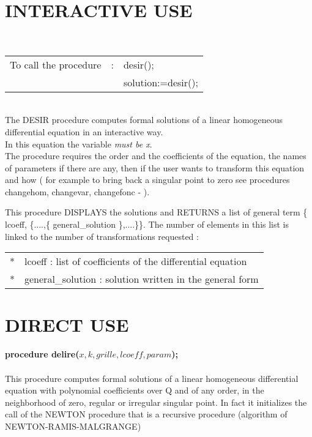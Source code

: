 \documentclass[a4paper]{article}
\begin{document}
\section{INTERACTIVE USE}
\ \\
\begin{tabular}{lcl}
To call the procedure & : & desir(); \\
                      &   & solution:=desir(); \\
\end{tabular}
\ \\
The DESIR procedure computes formal solutions of a linear homogeneous
differential equation in an interactive way. \\
In this equation the variable \emph{must be x}. \\

The procedure requires the order and the coefficients of the equation, the
names of parameters if there are any, then if the user wants to transform
this equation and how ( for example to bring back a singular point to zero
see procedures changehom, changevar, changefonc - ). \par
This procedure DISPLAYS the solutions and RETURNS a list of general term
\{ lcoeff, \{....,\{ general\_solution \},....\}\}. The number of elements in
this list is linked to the number of transformations requested : \\
\begin{tabular}{rl}
{*} & lcoeff : list of coefficients of the differential equation \\
{*} & general\_solution : solution written in the general form \\
\end{tabular}

\section{DIRECT USE}

{\bf procedure delire($x,k,grille,lcoeff,param$);} \\
\ \\
This procedure computes formal solutions of a linear homogeneous differential 
equation with polynomial coefficients over Q and of any order, in the
neighborhood of zero, regular or irregular singular point. In fact it
initializes the call of the NEWTON procedure that is a recursive procedure
(algorithm of NEWTON-RAMIS-MALGRANGE)
\end{document}

